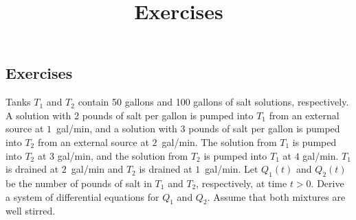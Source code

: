\documentclass{ximera}
\title{Exercises} \license{CC BY-NC-SA 4.0}
\begin{document}
\begin{abstract}
\end{abstract}
\maketitle

\begin{onlineOnly}
\section*{Exercises}
\end{onlineOnly}

\begin{problem}\label{exer:10.1.1}
Tanks $T_1$ and $T_2$ contain 50 gallons and 100 gallons of salt
solutions, respectively. A solution with 2 pounds of salt per gallon
is pumped into $T_1$ from an external source at $1$~gal/min, and a
solution with $3$ pounds of salt per gallon is pumped into $T_2$ from an
external source at $2$~gal/min. The solution from $T_1$ is pumped into
$T_2$ at $3$ gal/min, and the solution from $T_2$ is pumped into $T_1$
at $4$ gal/min. $T_1$ is drained at $2$~gal/min and $T_2$ is drained at
$1$~gal/min. Let $Q_1(t)$ and $Q_2(t)$ be the number of pounds of salt
in $T_1$ and $T_2$, respectively, at time $t>0$. Derive a system of
differential equations for $Q_1$ and $Q_2$. Assume that both mixtures
are well stirred.
\end{problem}
\end{document}
